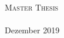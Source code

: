 \documentclass[
11pt, %
english, %
singlespacing, %
headsepline, %
consistentlayout, %
]{MastersDoctoralThesis} %
\author{Anne Fischer} %
\begin{document}
\frontmatter %

\pagestyle{plain} %


\begin{titlepage}
	
\begin{center}
		
	\HRule \\[0.4cm] %
	{\huge \bfseries \ttitle\par}\vspace{0.4cm} %
	\HRule \\[1.5cm] %
	
	
	\textsc{\LARGE Master Thesis}\\[8.9cm] %
	{\Large \authorname}\\[.2cm] %
	{\Large Dezember 2019}\\[1cm] %
	
	


	
	\vfill
	

	{\Large \univname\\} %
	{\Large \deptname\\\groupname\\[2cm]} %
	
	\vfill
	
	


\end{center}
\end{titlepage}
\end{document}
